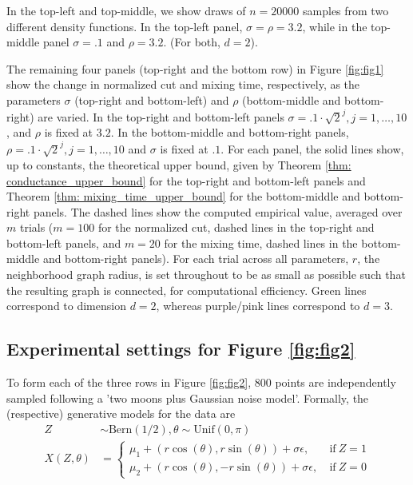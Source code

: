 \documentclass[11pt,twoside]{article}
\newcommand{\1}{\mathbf{1}}
\begin{document}
In the top-left and top-middle, we show draws of $n = 20000$ samples from two different density functions. In the top-left panel, $\sigma = \rho = 3.2$, while in the top-middle panel $\sigma = .1$ and $\rho = 3.2$. (For both, $d = 2$).

The remaining four panels (top-right and the bottom row) in Figure \ref{fig:fig1} show the change in normalized cut and mixing time, respectively, as the parameters $\sigma$ (top-right and bottom-left) and $\rho$ (bottom-middle and bottom-right) are varied. In the top-right and bottom-left panels $\sigma = .1 \cdot \sqrt{2}^j, j = 1,\ldots,10$, and $\rho$ is fixed at $3.2$. In the bottom-middle and bottom-right panels, $\rho = .1 \cdot \sqrt{2}^j, j = 1,\ldots,10$ and $\sigma$ is fixed at $.1$.
For each panel, the solid lines show, up to constants, the theoretical upper bound, given by Theorem \ref{thm: conductance_upper_bound} for the top-right and bottom-left panels and Theorem \ref{thm: mixing_time_upper_bound} for the bottom-middle and bottom-right panels. The dashed lines show the computed empirical value, averaged over $m$ trials ($m = 100$ for the normalized cut, dashed lines in the top-right and bottom-left panels, and $m = 20$ for the mixing time, dashed lines in the bottom-middle and bottom-right panels). For each trial across all parameters, $r$, the neighborhood graph radius, is set throughout to be as small as possible such that the resulting graph is connected, for computational efficiency. Green lines correspond to dimension $d = 2$, whereas purple/pink lines correspond to $d = 3$. 

\subsection{Experimental settings for Figure \ref{fig:fig2}}

To form each of the three rows in Figure \ref{fig:fig2}, 800 points are independently sampled following a 'two moons plus Gaussian noise model'. Formally, the (respective) generative models for the data are
\begin{align}
Z & \sim \textrm{Bern}(1/2), \theta \sim \textrm{Unif}(0, \pi) \\
X(Z,\theta) & = 
\begin{cases}
\mu_1 + (r \cos(\theta), r \sin(\theta)) + \sigma \epsilon,~ & \text{if}~ Z = 1 \\
\mu_2 + (r \cos(\theta), - r \sin(\theta)) + \sigma \epsilon,~ & \text{if}~ Z = 0
\end{cases}
\end{align}
\end{document}
